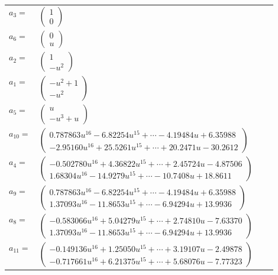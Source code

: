 \documentclass[1p]{elsarticle_modified}
\theoremstyle{definition}
\begin{document}
\begin{tabular}{m{7pt} m{180pt} m{7pt} m{180pt} }
\flushright $a_{3}=$&$\begin{pmatrix}1\\0\end{pmatrix}$ \\
\flushright $a_{6}=$&$\begin{pmatrix}0\\u\end{pmatrix}$ \\
\flushright $a_{2}=$&$\begin{pmatrix}1\\- u^2\end{pmatrix}$ \\
\flushright $a_{1}=$&$\begin{pmatrix}- u^2+1\\- u^2\end{pmatrix}$ \\
\flushright $a_{5}=$&$\begin{pmatrix}u\\- u^3+u\end{pmatrix}$ \\
\flushright $a_{10}=$&$\begin{pmatrix}0.787863 u^{16}-6.82254 u^{15}+\cdots-4.19484 u+6.35988\\-2.95160 u^{16}+25.5261 u^{15}+\cdots+20.2471 u-30.2612\end{pmatrix}$ \\
\flushright $a_{4}=$&$\begin{pmatrix}-0.502780 u^{16}+4.36822 u^{15}+\cdots+2.45724 u-4.87506\\1.68304 u^{16}-14.9279 u^{15}+\cdots-10.7408 u+18.8611\end{pmatrix}$ \\
\flushright $a_{9}=$&$\begin{pmatrix}0.787863 u^{16}-6.82254 u^{15}+\cdots-4.19484 u+6.35988\\1.37093 u^{16}-11.8653 u^{15}+\cdots-6.94294 u+13.9936\end{pmatrix}$ \\
\flushright $a_{8}=$&$\begin{pmatrix}-0.583066 u^{16}+5.04279 u^{15}+\cdots+2.74810 u-7.63370\\1.37093 u^{16}-11.8653 u^{15}+\cdots-6.94294 u+13.9936\end{pmatrix}$ \\
\flushright $a_{11}=$&$\begin{pmatrix}-0.149136 u^{16}+1.25050 u^{15}+\cdots+3.19107 u-2.49878\\-0.717661 u^{16}+6.21375 u^{15}+\cdots+5.68076 u-7.77323\end{pmatrix}$ \\

\end{tabular}
\end{document}
